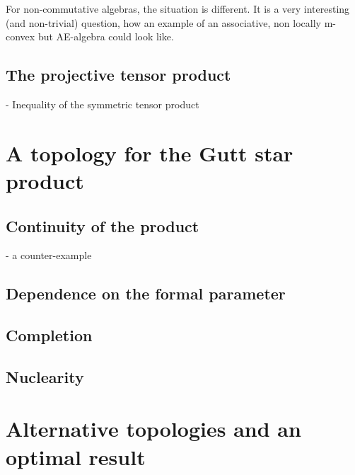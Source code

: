 For non-commutative algebras, the situation is different. It is a very 
interesting (and non-trivial) question, how an example of an 
associative, non locally m-convex but AE-algebra could look like.


\subsection{The projective tensor product}
 - Inequality of the symmetric tensor product



\section{A topology for the Gutt star product}
\label{sec:chap5_TopologyStar}

\subsection{Continuity of the product}
 - a counter-example
 
\subsection{Dependence on the formal parameter}

\subsection{Completion}

\subsection{Nuclearity}



\section{Alternative topologies and an optimal result}
\label{sec:chap5_AlternativeOptimal}
